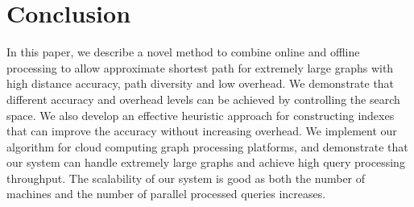 \section{Conclusion}
\label{conclusion}

In this paper, we describe a novel method to combine online and offline processing to allow approximate shortest path for extremely large graphs with high distance accuracy, path diversity and low overhead. We demonstrate that different accuracy and overhead levels can be achieved by controlling the search space. We also develop an effective heuristic approach for constructing indexes that can improve the accuracy without increasing overhead. We implement our algorithm for cloud computing graph processing platforms, and demonstrate that our system can handle extremely large graphs and achieve high query processing throughput. The scalability of our system is good as both the number of machines and the number of parallel processed queries increases. 
